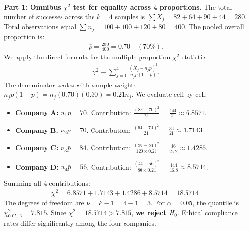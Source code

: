 \begin{solucion}
	\textbf{Part 1: Omnibus $\chi^2$ test for equality across 4 proportions.}
	The total number of successes across the $k=4$ samples is $\sum X_j = 82 + 64 + 90 + 44 = 280$. Total observations equal $\sum n_j = 100 + 100 + 120 + 80 = 400$. The pooled overall proportion is:
	\begin{align}
		\bar{p} = \frac{280}{400} = 0.70 \quad (70\%).
	\end{align}
	We apply the direct formula for the multiple proportion $\chi^2$ statistic:
	\begin{align}
		\chi^2 = \sum_{j=1}^4 \frac{(X_j - n_j \bar{p})^2}{n_j \bar{p}(1-\bar{p})}.
	\end{align}
	The denominator scales with sample weight: $n_j \bar{p}(1-\bar{p}) = n_j(0.70)(0.30) = 0.21 n_j$. We evaluate cell by cell:
	\begin{itemize}
		\item \textbf{Company A:} $n_1 \bar{p} = 70$. Contribution: $\frac{(82 - 70)^2}{21} = \frac{144}{21} \approx 6.8571$.
		\item \textbf{Company B:} $n_2 \bar{p} = 70$. Contribution: $\frac{(64 - 70)^2}{21} = \frac{36}{21} \approx 1.7143$.
		\item \textbf{Company C:} $n_3 \bar{p} = 84$. Contribution: $\frac{(90 - 84)^2}{120 \times 0.21} = \frac{36}{25.2} \approx 1.4286$.
		\item \textbf{Company D:} $n_4 \bar{p} = 56$. Contribution: $\frac{(44 - 56)^2}{80 \times 0.21} = \frac{144}{16.8} \approx 8.5714$.
	\end{itemize}
	Summing all 4 contributions:
	\begin{align}
		\chi^2 = 6.8571 + 1.7143 + 1.4286 + 8.5714 = 18.5714.
	\end{align}
	The degrees of freedom are $\nu = k - 1 = 4 - 1 = 3$. For $\alpha = 0.05$, the quantile is $\chi^2_{0.05, \, 3} = 7.815$.
	Since $\chi^2 = 18.5714 > 7.815$, \textbf{we reject $H_0$}. Ethical compliance rates differ significantly among the four companies.
	

\end{solucion}
